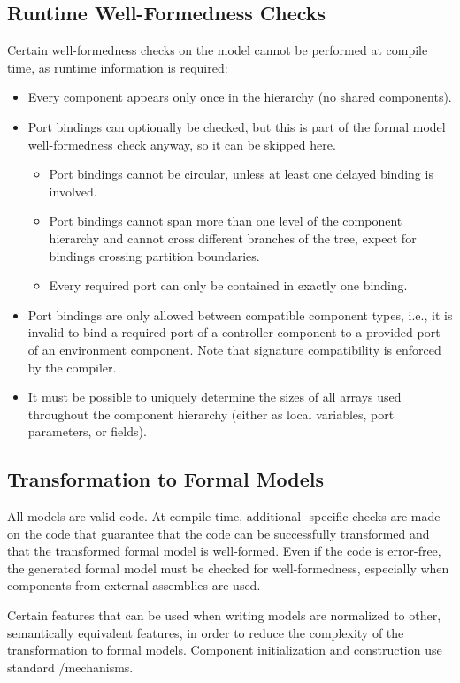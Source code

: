 \documentclass[a4paper,10pt,english]{article}
\begin{document}
\subsection{Runtime Well-Formedness Checks}
Certain well-formedness checks on the \SSharp model cannot be performed at compile time, as runtime information is required:
\begin{itemize}
	\item Every component appears only once in the hierarchy (no shared components).
	\item Port bindings can optionally be checked, but this is part of the formal model well-formedness check anyway, so it can be
	skipped here.
	\begin{itemize} 
		\item Port bindings cannot be circular, unless at least one delayed binding is involved.
		\item Port bindings cannot span more than one level of the component hierarchy and cannot cross different branches of the tree,
		expect for bindings crossing partition boundaries.
		\item Every required port can only be contained in exactly one binding.
	\end{itemize}
	\item Port bindings are only allowed between compatible component types, i.e., it is invalid to bind a required port of a
	controller component to a provided port of an environment component. Note that signature compatibility is enforced by the \CSharp
	compiler.
	\item It must be possible to uniquely determine the sizes of all arrays used throughout the component hierarchy (either as local
	variables, port parameters, or fields). 
\end{itemize}

\subsection{Transformation to Formal Models}
All \SSharp models are valid \CSharp code. At compile time, additional \SSharp-specific checks are made on the
\CSharp code that guarantee that the code can be successfully transformed and that the transformed formal model is well-formed.
Even if the \CSharp code is error-free, the generated formal model must be checked for well-formedness, especially when components
from external \SSharp assemblies are used.

Certain \CSharp features that can be used when writing \SSharp models are normalized to other, semantically equivalent
\CSharp features, in order to reduce the complexity of the transformation to formal models. Component initialization and
construction use standard \CSharp/\DotNet mechanisms.
\end{document}
